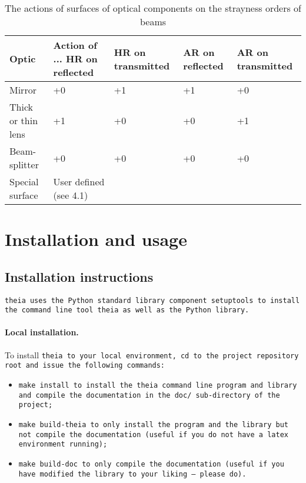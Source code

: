\documentclass{article}
\begin{document}
\begin{table}[h]
\begin{center}


\begin{tabular}{|p{1.5cm}|p{3.2cm}|p{3.2cm}|p{3.2cm}|p{3.2cm}|} \hline
\bf{Optic} & \bf{Action of ... HR on reflected} & \bf{HR on transmitted} & \bf{AR on reflected} & \bf{AR on transmitted } \\ \hline \hline
Mirror & +0 & +1 &+1 &+0 \\ \hline

Thick or thin lens & +1 & +0 & +0 & +1 \\ \hline

Beam-splitter & +0 & +0 & +0 & +0 \\ \hline

Special surface & User defined (see 4.1) & & & \\ \hline
\end{tabular}
\end{center}
\caption{The actions of surfaces of optical components on the strayness orders of beams}
\label{actions}
\end{table}

\section{Installation and usage}
\subsection{Installation instructions}
\tt{theia} uses the Python standard library component \tt{setuptools} to install the command line tool \tt{theia} as well as the Python library.

\paragraph{Local installation.}To install \tt{theia} to your local environment, \tt{cd} to the project repository root and issue the following commands:

\begin{itemize}
\item \tt{make install} to install the \tt{theia} command line program and library and compile the documentation in the \tt{doc/} sub-directory of the project;
\item \tt{make build-theia} to only install the program and the library but not compile the documentation (useful if you do not have a latex environment running);
\item \tt{make build-doc} to only compile the documentation (useful if you have modified the library to your liking --~please do).
\end{itemize}
\end{document}
